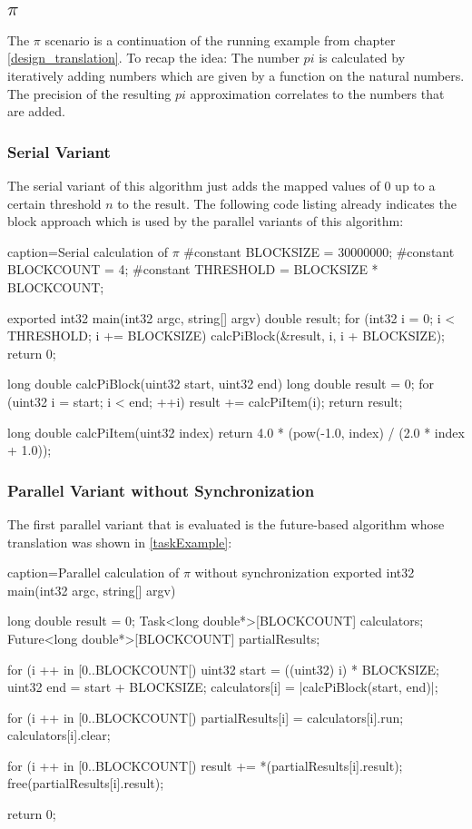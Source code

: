 \subsection{$\pi$}
The $\pi$ scenario is a continuation of the running example from chapter \ref{design_translation}. To recap the idea: The number $pi$ is calculated by iteratively adding numbers which are given by a function on the natural numbers. The precision of the resulting $pi$ approximation correlates to the numbers that are added. 

\subsubsection{Serial Variant}
The serial variant of this algorithm just adds the mapped values of $0$ up to a certain threshold $n$ to the result. The following code listing already indicates the block approach which is used by the parallel variants of this algorithm:

\begin{ccode}{caption=Serial calculation of $\pi$}
#constant BLOCKSIZE = 30000000; 
#constant BLOCKCOUNT = 4; 
#constant THRESHOLD = BLOCKSIZE * BLOCKCOUNT;

exported int32 main(int32 argc, string[] argv) { 
  double result;   
  for (int32 i = 0; i < THRESHOLD; i += BLOCKSIZE) { 
    calcPiBlock(&result, i, i + BLOCKSIZE); 
  }   
  return 0; 
}

long double calcPiBlock(uint32 start, uint32 end) { 
  long double result = 0; 
  for (uint32 i = start; i < end; ++i) { 
    result += calcPiItem(i); 
  }
  return result; 
}
 
long double calcPiItem(uint32 index) { 
  return 4.0 * (pow(-1.0, index) / (2.0 * index + 1.0)); 
}
\end{ccode}

\subsubsection{Parallel Variant without Synchronization}
\label{nonSyncPi}
The first parallel variant that is evaluated is the future-based algorithm whose translation was shown in \ref{taskExample}:
\begin{ccode}{caption=Parallel calculation of $\pi$ without synchronization}
exported int32 main(int32 argc, string[] argv) { 
  long double result = 0; 
  Task<long double*>[BLOCKCOUNT] calculators; 
  Future<long double*>[BLOCKCOUNT] partialResults; 
   
  for (i ++ in [0..BLOCKCOUNT[) { 
    uint32 start = ((uint32) i) * BLOCKSIZE; 
    uint32 end = start + BLOCKSIZE; 
    calculators[i] = |calcPiBlock(start, end)|; 
  }
   
  for (i ++ in [0..BLOCKCOUNT[) { 
    partialResults[i] = calculators[i].run; 
    calculators[i].clear; 
  }
   
  for (i ++ in [0..BLOCKCOUNT[) { 
    result += *(partialResults[i].result); 
    free(partialResults[i].result); 
  }
   
  return 0; 
}
\end{ccode}

